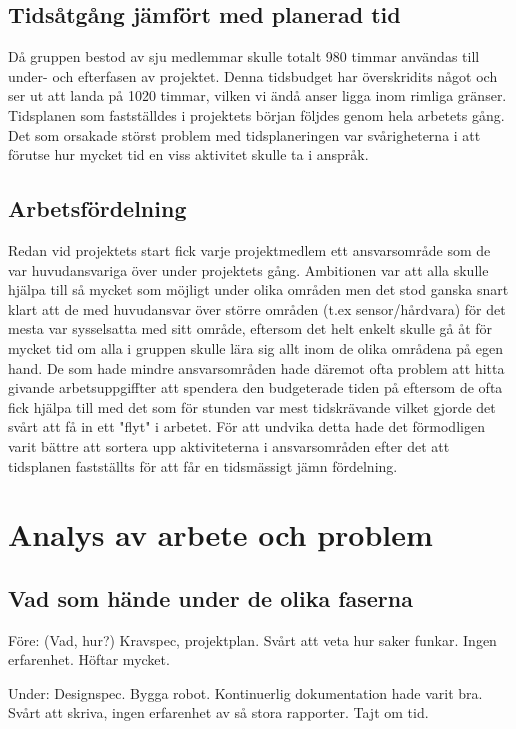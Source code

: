\documentclass[a4paper,12pt]{article}
\begin{document}
\subsection{Tidsåtgång jämfört med planerad tid}
Då gruppen bestod av sju medlemmar skulle totalt 980 timmar användas till under- och efterfasen av projektet. Denna tidsbudget har överskridits något och ser ut att landa på 1020 timmar, vilken vi ändå anser ligga inom rimliga gränser. Tidsplanen som fastställdes i projektets början följdes genom hela arbetets gång. Det som orsakade störst problem med tidsplaneringen var svårigheterna i att förutse hur mycket tid en viss aktivitet skulle ta i anspråk.
\subsection{Arbetsfördelning}
Redan vid projektets start fick varje projektmedlem ett ansvarsområde som de var huvudansvariga över under projektets gång. Ambitionen var att alla skulle hjälpa till så mycket som möjligt under olika områden men det stod ganska snart klart att de med huvudansvar över större områden (t.ex sensor/hårdvara) för det mesta var sysselsatta med sitt område, eftersom det helt enkelt skulle gå åt för mycket tid om alla i gruppen skulle lära sig allt inom de olika områdena på egen hand. De som hade mindre ansvarsområden hade däremot ofta problem att hitta givande arbetsuppgiffter att spendera den budgeterade tiden på eftersom de ofta fick hjälpa till med det som för stunden var mest tidskrävande vilket gjorde det svårt att få in ett "flyt" i arbetet.
För att undvika detta hade det förmodligen varit bättre att sortera upp aktiviteterna i ansvarsområden efter det att tidsplanen fastställts för att får en tidsmässigt jämn fördelning.

\section{Analys av arbete och problem}

\subsection{Vad som hände under de olika faserna}
Före: (Vad, hur?) Kravspec, projektplan.  Svårt att veta hur saker funkar. Ingen erfarenhet. Höftar mycket. 

Under: Designspec. Bygga robot. Kontinuerlig dokumentation hade varit bra. Svårt att skriva, ingen erfarenhet av så stora rapporter. Tajt om tid. 
\end{document}

